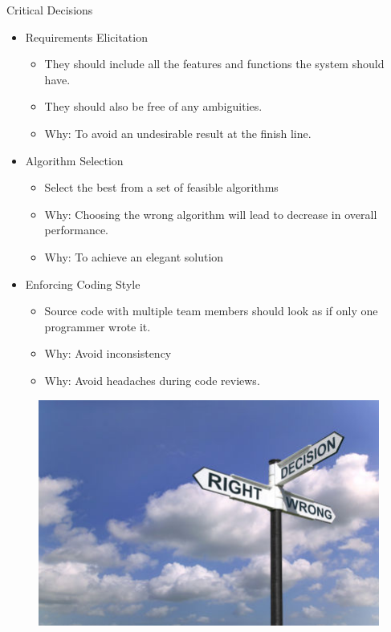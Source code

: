 \documentclass[final]{beamer}
\newlength{\onecolwid}
\newlength{\twocolwid}
\begin{document}
\begin{frame}
\begin{columns}[t]
\begin{column}{\twocolwid}
\begin{columns}[t,totalwidth=\twocolwid]
\begin{column}{\onecolwid}
\begin{exampleblock}{Critical Decisions}

\begin{itemize}
    \item Requirements Elicitation
    \begin{itemize}
        \item They should include all the features and functions the system should have. 
        \item They should also be free of any ambiguities.
        \item Why: To avoid an undesirable result at the finish line.  
    \end{itemize}
    \item Algorithm\cite{power} Selection
    \begin{itemize}
        \item Select the best from a set of feasible algorithms
        \item Why: Choosing the wrong algorithm will lead to decrease in overall performance.  
        \item Why: To achieve an elegant solution
    \end{itemize}
    \item Enforcing Coding Style 
    \begin{itemize}
        \item Source code with multiple team members should look as if only one programmer wrote it.
        \item Why: Avoid inconsistency
        \item Why: Avoid headaches during code reviews.
    \end{itemize}
\end{itemize}




\end{exampleblock}
\begin{figure}
\includegraphics[width=0.8\linewidth]{criti.jpg}
\end{figure}


\end{column}
\end{columns}
\end{column}
\end{columns}
\end{frame}
\end{document}
